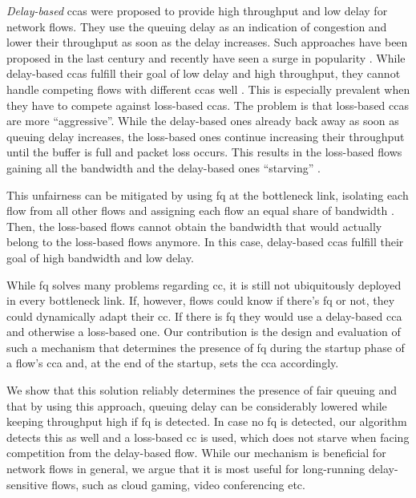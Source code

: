 \documentclass[runningheads]{llncs}
\begin{document}
\textit{Delay-based} \glspl{cca} were proposed to provide high throughput and low delay for network flows. They use the queuing delay as an indication of congestion and lower their throughput as soon as the delay increases. Such approaches have been proposed in the last century \cite{brakmo_tcp_1995} and recently have seen a surge in popularity \cite{arun_copa_2018,hock_tcp_2017,mittal_timely_2015,cardwell_bbr:_2016}. While delay-based \glspl{cca} fulfill their goal of low delay and high throughput, they cannot handle competing flows with different \glspl{cca} well \cite{turkovic_fifty_2019, turkovic_interactions_2019}. This is especially prevalent when they have to compete against loss-based \glspl{cca}. The problem is that loss-based \glspl{cca} are more ``aggressive''. While the delay-based ones already back away as soon as queuing delay increases, the loss-based ones continue increasing their throughput until the buffer is full and packet loss occurs. This results in the loss-based flows gaining all the bandwidth and the delay-based ones ``starving'' \cite{hock_toward_2016,yuan-cheng_lai_improving_2001,awdeh_comparing_2004}.

This unfairness can be mitigated by using \gls{fq} at the bottleneck link, isolating each flow from all other flows and assigning each flow an equal share of bandwidth \cite{dumazet_pkt_sched:_2013}. Then, the loss-based flows cannot obtain the bandwidth that would actually belong to the loss-based flows anymore. In this case, delay-based \glspl{cca} fulfill their goal of high bandwidth and low delay. 

While \gls{fq} solves many problems regarding \gls{cc}, it is still not ubiquitously deployed in every bottleneck link. If, however, flows could know if there's \gls{fq} or not, they could dynamically adapt their \gls{cc}. If there is \gls{fq} they would use a delay-based \gls{cca} and otherwise a loss-based one. Our contribution is the design and evaluation of such a mechanism that determines the presence of \gls{fq} during the startup phase of a flow's \gls{cca} and, at the end of the startup, sets the \gls{cca} accordingly. 

We show that this solution reliably determines the presence of fair queuing and that by using this approach, queuing delay can be considerably lowered while keeping throughput high if \gls{fq} is detected. In case no \gls{fq} is detected, our algorithm detects this as well and a loss-based \gls{cc} is used, which does not starve when facing competition from the delay-based flow. While our mechanism is beneficial for network flows in general, we argue that it is most useful for long-running delay-sensitive flows, such as cloud gaming, video conferencing etc. 
\end{document}
